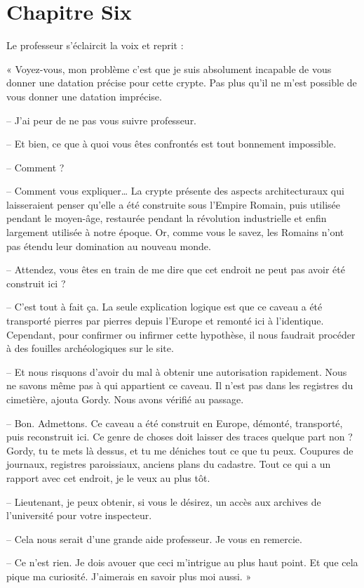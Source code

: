 \chapter[Chapitre Six]{Chapitre Six}
Le professeur s'éclaircit la voix et reprit :

« Voyez-vous, mon problème c'est que je suis absolument incapable de vous donner une datation précise pour cette crypte.
Pas plus qu'il ne m'est possible de vous donner une datation imprécise.

-- J'ai peur de ne pas vous suivre professeur.

-- Et bien, ce que à quoi vous êtes confrontés est tout bonnement impossible.

-- Comment ?

-- Comment vous expliquer\ldots{} La crypte présente des aspects architecturaux qui laisseraient penser qu'elle a été
construite sous l'Empire Romain, puis utilisée pendant le moyen-âge, restaurée pendant la révolution industrielle et
enfin largement utilisée à notre époque. Or, comme vous le savez, les Romains n'ont pas étendu leur domination au
nouveau monde.

-- Attendez, vous êtes en train de me dire que cet endroit ne peut pas avoir été construit ici ?

-- C'est tout à fait ça. La seule explication logique est que ce caveau a été transporté pierres par pierres depuis
l'Europe et remonté ici à l'identique. Cependant, pour confirmer ou infirmer cette hypothèse, il nous faudrait procéder
à des fouilles archéologiques sur le site.

-- Et nous risquons d'avoir du mal à obtenir une autorisation rapidement. Nous ne savons même pas à qui appartient ce
caveau. Il n'est pas dans les registres du cimetière, ajouta Gordy. Nous avons vérifié au passage.

-- Bon. Admettons. Ce caveau a été construit en Europe, démonté, transporté, puis reconstruit ici. Ce genre de choses
doit laisser des traces quelque part non ? Gordy, tu te mets là dessus, et tu me déniches tout ce que tu peux. Coupures
de journaux, registres paroissiaux, anciens plans du cadastre. Tout ce qui a un rapport avec cet endroit, je le veux au
plus tôt.

-- Lieutenant, je peux obtenir, si vous le désirez, un accès aux archives de l'université pour votre inspecteur.

-- Cela nous serait d'une grande aide professeur. Je vous en remercie.

-- Ce n'est rien. Je dois avouer que ceci m'intrigue au plus haut point. Et que cela pique ma curiosité. J'aimerais en
savoir plus moi aussi. »


